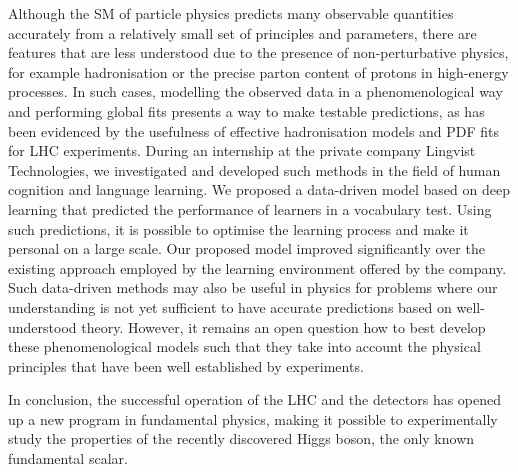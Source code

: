 Although the SM of particle physics predicts many observable quantities accurately from a relatively small set of principles and parameters, there are features that are less understood due to the presence of non-perturbative physics, for example hadronisation or the precise parton content of protons in high-energy processes. In such cases, modelling the observed data in a phenomenological way and performing global fits presents a way to make testable predictions, as has been evidenced by the usefulness of effective hadronisation models and PDF fits for LHC experiments. During an internship at the private company Lingvist Technologies, we investigated and developed such methods in the field of human cognition and language learning. We proposed a data-driven model based on deep learning that predicted the performance of learners in a vocabulary test. Using such predictions, it is possible to optimise the learning process and make it personal on a large scale. Our proposed model improved significantly over the existing approach employed by the learning environment offered by the company. Such data-driven methods may also be useful in physics for problems where our understanding is not yet sufficient to have accurate predictions based on well-understood theory. However, it remains an open question how to best develop these phenomenological models such that they take into account the physical principles that have been well established by experiments.

In conclusion, the successful operation of the LHC and the detectors has opened up a new program in fundamental physics, making it possible to experimentally study the properties of the recently discovered Higgs boson, the only known fundamental scalar. 